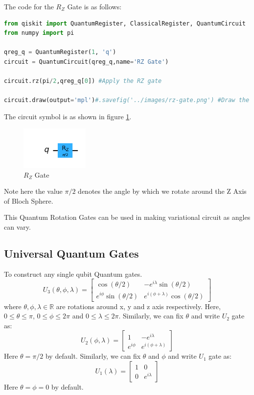 \documentclass[12pt, oneside]{book}
\theoremstyle{definition}
\theoremstyle{definition}
\theoremstyle{remark}
\begin{document}
The code for the $R_Z$ Gate is as follows:
\begin{lstlisting}[language=Python]
from qiskit import QuantumRegister, ClassicalRegister, QuantumCircuit
from numpy import pi

qreg_q = QuantumRegister(1, 'q')
circuit = QuantumCircuit(qreg_q,name='RZ Gate')

circuit.rz(pi/2,qreg_q[0]) #Apply the RZ gate

circuit.draw(output='mpl')#.savefig('../images/rz-gate.png') #Draw the circuit
\end{lstlisting}

The circuit symbol is as shown in figure \ref{fig:rz}.
\begin{figure}[H]
    \centering
    \includegraphics[width=0.3\textwidth]{../images/rz-gate.png}
    \caption{$R_Z$ Gate}
    \label{fig:rz}
\end{figure}
Note here the value $\pi/2$ denotes the angle by which we rotate around the Z Axis of Bloch Sphere.

This Quantum Rotation Gates can be used in making variational circuit as angles can vary.

\subsection{Universal Quantum Gates}
To construct any single qubit Quantum gates.
\[
    U_3(\theta,\phi,\lambda)=\begin{bmatrix}
        \cos(\theta/2) & -e^{i\lambda}\sin(\theta/2) \\
        e^{i\phi}\sin(\theta/2) & e^{i(\phi+\lambda)}\cos(\theta/2)
    \end{bmatrix}
\]
where $\theta,\phi,\lambda\in\mathbb{R}$ are rotations around x, y and z axis respectively.
Here, $0 \leq \theta \leq \pi$, $0\leq \phi \leq 2\pi$ and $0\leq \lambda \leq 2\pi$.
Similarly, we can fix $\theta$ and write $U_2$ gate as:
\[
    U_2(\phi,\lambda)=\begin{bmatrix}
        1 & -e^{i\lambda} \\
        e^{i\phi} & e^{i(\phi+\lambda)}
    \end{bmatrix}
\]
Here $\theta=\pi/2$ by default.
Similarly, we can fix $\theta$ and $\phi$ and write $U_1$ gate as:
\[
    U_1(\lambda)=\begin{bmatrix}
        1 & 0 \\
        0 & e^{i\lambda}
    \end{bmatrix}
\]
Here $\theta=\phi=0$ by default.
\end{document}
